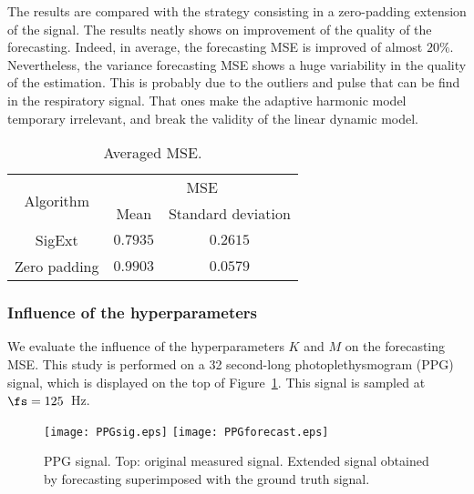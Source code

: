 The results are compared with the strategy consisting in a zero-padding extension of the signal. The results neatly shows on improvement of the quality of the forecasting. Indeed, in average, the forecasting MSE is improved of almost $20\%$. Nevertheless, the variance forecasting MSE shows a huge variability in the quality of the estimation. This is probably due to the outliers and pulse that can be find in the respiratory signal. That ones make the adaptive harmonic model temporary irrelevant, and break the validity of the linear dynamic model.  

\begin{table}
\centering
\caption{Averaged MSE.}
\begin{tabular}{|c||c|c|}
  \hline
   \multirow{2}{*}{Algorithm} & \multicolumn{2}{c|}{MSE} \\
   \cline{2-3}
      & Mean & Standard deviation\\
   \hhline{|=#=|=|}
   {\sf SigExt} & $0.7935$ & $0.2615$ \\
   \hline
   Zero padding & $0.9903$ & $0.0579$ \\
   \hline
\end{tabular}
\label{tab:mse}
\end{table}

\subsubsection{Influence of the hyperparameters}
\label{ssse:hyperparam}
We evaluate the influence of the hyperparameters $K$ and $M$ on the forecasting MSE. This study is performed on a 32 second-long photoplethysmogram (PPG) signal, which is displayed on the top of Figure~\ref{fig:ppg}. This signal is sampled at $\fs=125$~Hz.

\begin{figure}
\texttt{[image: PPGsig.eps]}
\texttt{[image: PPGforecast.eps]}
\caption{PPG signal. Top: original measured signal. Extended signal obtained by forecasting superimposed with the ground truth signal.}
\label{fig:ppg}
\end{figure}

